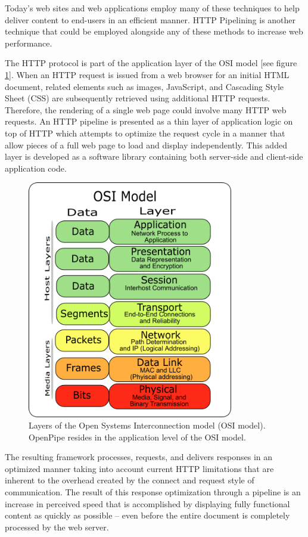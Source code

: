 \documentclass[12pt]{report}
\begin{document}
Today's web sites and web applications employ many of these techniques to help deliver content to end-users in an efficient manner. HTTP Pipelining is another technique that could be employed alongside any of these methods to increase web performance.

The HTTP protocol is part of the application layer of the OSI model [see figure \ref{fig:osiModel}].  When an HTTP request is issued from a web browser for an initial HTML document, related elements such as images, JavaScript, and Cascading Style Sheet (CSS) are subsequently retrieved using additional HTTP requests. Therefore, the rendering of a single web page could involve many HTTP web requests. An HTTP pipeline is presented as a thin layer of application logic on top of HTTP which attempts to optimize the request cycle in a manner that allow pieces of a full web page to load and display independently.  This added layer is developed as a software library containing both server-side and client-side application code.

\begin{figure}[H]
\label{fig:osiModel}
\centering
\includegraphics[width=90mm]{figures/images/osi_model.png}
\caption{Layers of the Open Systems Interconnection model (OSI model). OpenPipe resides in the application level of the OSI model.}
\end{figure}

The resulting framework processes, requests, and delivers responses in an optimized manner taking into account current HTTP limitations that are inherent to the overhead created by the connect and request style of communication. The result of this response optimization through a pipeline is an increase in perceived speed that is accomplished by displaying fully functional content as quickly as possible – even before the entire document is completely processed by the web server.
\end{document}
